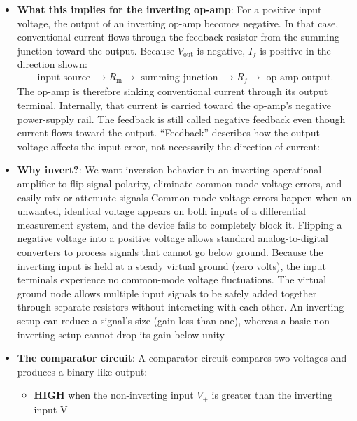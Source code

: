 \documentclass{report}
\begin{document}
\begin{itemize}
        \item \textbf{What this implies for the inverting op-amp}: For a positive input voltage, the output of an inverting op-amp becomes negative. In that case, conventional current flows through the feedback resistor from the summing junction toward the output.
            \bigbreak \noindent 
            Because \(V_{\text{out}}\) is negative, \(I_f\) is positive in the direction shown:
            \begin{align*}
                \text{input source } \to R_{\text{in}} \to \text{ summing junction } \to R_{f} \to \text{ op-amp output}
            .\end{align*}
            The op-amp is therefore sinking conventional current through its output terminal. Internally, that current is carried toward the op-amp’s negative power-supply rail.
            \bigbreak \noindent 
            The feedback is still called negative feedback even though current flows toward the output. “Feedback” describes how the output voltage affects the input error, not necessarily the direction of current:
        \item \textbf{Why invert?}: We want inversion behavior in an inverting operational amplifier to flip signal polarity, eliminate common-mode voltage errors, and easily mix or attenuate signals
            \bigbreak \noindent 
            Common-mode voltage errors happen when an unwanted, identical voltage appears on both inputs of a differential measurement system, and the device fails to completely block it.
            \bigbreak \noindent 
            Flipping a negative voltage into a positive voltage allows standard analog-to-digital converters to process signals that cannot go below ground.
            \bigbreak \noindent 
            Because the inverting input is held at a steady virtual ground (zero volts), the input terminals experience no common-mode voltage fluctuations.
            \bigbreak \noindent 
            The virtual ground node allows multiple input signals to be safely added together through separate resistors without interacting with each other.
            \bigbreak \noindent 
            An inverting setup can reduce a signal's size (gain less than one), whereas a basic non-inverting setup cannot drop its gain below unity
        \item \textbf{The comparator circuit}: A comparator circuit compares two voltages and produces a binary-like output:
            \begin{itemize}
                \item \textbf{HIGH} when the non-inverting input \(V_+\) is greater than the inverting input V

\end{itemize}
\end{itemize}
\end{document}
